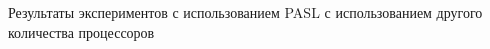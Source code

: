 \documentclass[hyperref=unicode,graphics=pdflatex,13pt]{beamer}
\begin{document}
\begin{frame}[shrink]{Результаты экспериментов с использованием PASL с использованием другого количества процессоров}
\begin{center}
\begin{figure}
\centering
{}
\end{figure}
\end{center}
\end{frame}
\end{document}
